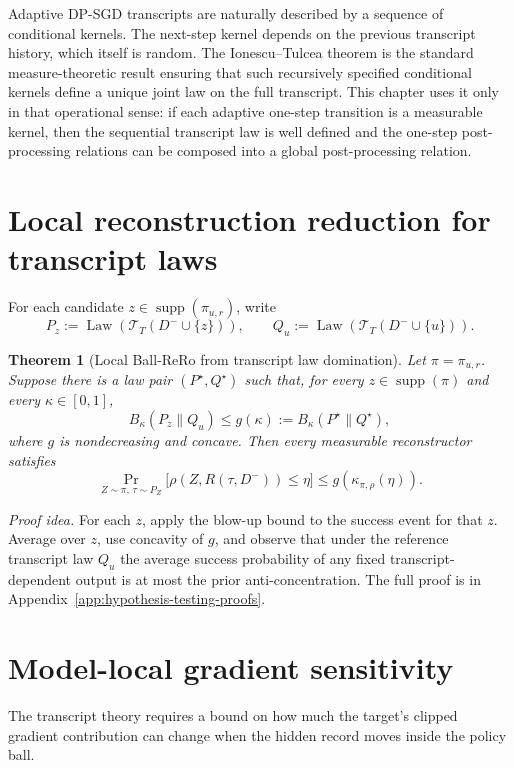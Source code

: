 \documentclass[11pt,a4paper]{report}
\theoremstyle{plain}
\newtheorem{theorem}{Theorem}[chapter]
\theoremstyle{definition}
\theoremstyle{remark}
\DeclareMathOperator{\Law}{Law}
\DeclareMathOperator{\supp}{supp}
\newcommand{\cT}{\mathcal{T}}
\begin{document}
Adaptive DP-SGD transcripts are naturally described by a sequence of conditional kernels.  The next-step kernel depends on the previous transcript history, which itself is random.  The Ionescu--Tulcea theorem is the standard measure-theoretic result ensuring that such recursively specified conditional kernels define a unique joint law on the full transcript.  This chapter uses it only in that operational sense: if each adaptive one-step transition is a measurable kernel, then the sequential transcript law is well defined and the one-step post-processing relations can be composed into a global post-processing relation.

\section{Local reconstruction reduction for transcript laws}
\label{sec:local-transcript-rero}

For each candidate $z\in\supp(\pi_{u,r})$, write
\[
P_z:=\Law(\cT_T(D^-\cup\{z\})),
\qquad
Q_u:=\Law(\cT_T(D^-\cup\{u\})).
\]

\begin{theorem}[Local Ball-ReRo from transcript law domination]
\label{thm:local-ball-rero}
Let $\pi=\pi_{u,r}$.  Suppose there is a law pair $(P^\star,Q^\star)$ such that, for every $z\in\supp(\pi)$ and every $\kappa\in[0,1]$,
\[
B_\kappa(P_z\|Q_u)
\le
 g(\kappa)
:=B_\kappa(P^\star\|Q^\star),
\]
where $g$ is nondecreasing and concave.  Then every measurable reconstructor satisfies
\[
\Pr_{Z\sim\pi,\,\tau\sim P_Z}
\big[\rho(Z,R(\tau,D^-))\le\eta\big]
\le
 g(\kappa_{\pi,\rho}(\eta)).
\]
\end{theorem}

\noindent\emph{Proof idea.}
For each $z$, apply the blow-up bound to the success event for that $z$.  Average over $z$, use concavity of $g$, and observe that under the reference transcript law $Q_u$ the average success probability of any fixed transcript-dependent output is at most the prior anti-concentration.  The full proof is in Appendix~\ref{app:hypothesis-testing-proofs}.

\section{Model-local gradient sensitivity}
\label{sec:model-local-gradient-sensitivity}

The transcript theory requires a bound on how much the target's clipped gradient contribution can change when the hidden record moves inside the policy ball.
\end{document}
